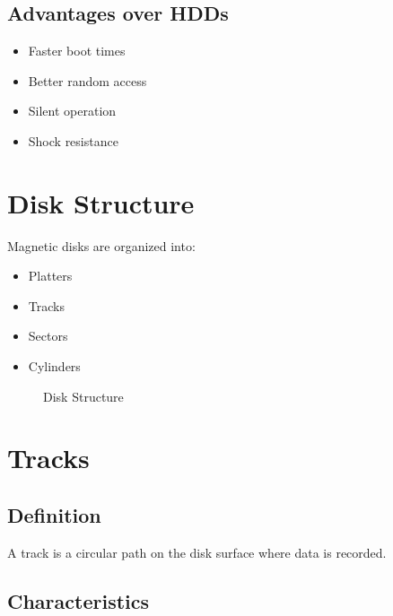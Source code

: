 \subsection{Advantages over HDDs}

\begin{itemize}
\item Faster boot times
\item Better random access
\item Silent operation
\item Shock resistance
\end{itemize}

\section{Disk Structure}

Magnetic disks are organized into:

\begin{itemize}
\item Platters
\item Tracks
\item Sectors
\item Cylinders
\end{itemize}

\begin{figure}[h]
\centering
{}
\caption{Disk Structure}
\end{figure}

\section{Tracks}

\subsection{Definition}

A track is a circular path on the disk surface where data is recorded.

\subsection{Characteristics}

